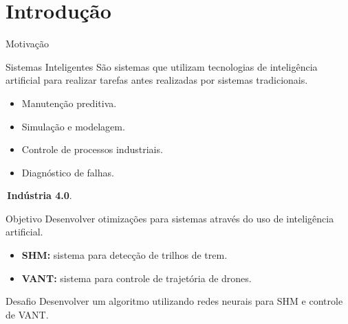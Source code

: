 \section{Introdução}
\begin{frame}{Motivação}
\begin{block}{Sistemas Inteligentes}
    São sistemas que utilizam tecnologias de inteligência artificial para realizar tarefas antes realizadas por sistemas tradicionais.    
\end{block}
\vfill
\begin{itemize}
    \item Manutenção preditiva.
    \item Simulação e modelagem.
    \item Controle de processos industriais.
    \item Diagnóstico de falhas.
\end{itemize} \pause
\vfill
\lefthand\,\textbf{Indústria 4.0}.
\end{frame}
\begin{frame}{Objetivo}
Desenvolver otimizações para sistemas através do uso de inteligência artificial. \pause
\vfill
\begin{itemize}
    \item \textbf{SHM:} sistema para detecção de trilhos de trem. 
    \item \textbf{VANT:} sistema para controle de trajetória de drones.
\end{itemize} \pause
\vfill
\begin{block}{Desafio}
    Desenvolver um algoritmo utilizando redes neurais para SHM e controle de VANT.
\end{block}
\end{frame} 




